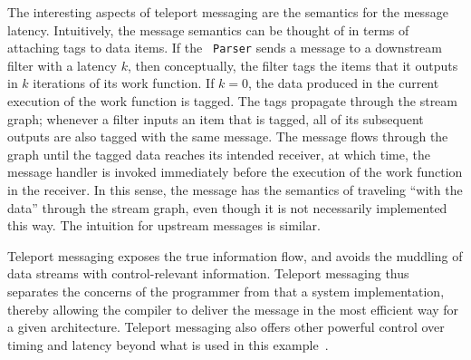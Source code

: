 The interesting aspects of teleport messaging are the semantics for
the message latency.  Intuitively, the message semantics can be
thought of in terms of attaching tags to data items.  If the {\tt
Parser} sends a message to a downstream filter with a latency $k$,
then conceptually, the filter tags the items that it outputs in $k$
iterations of its work function. If $k=0$, the data produced in the
current execution of the work function is tagged. The tags propagate
through the stream graph; whenever a filter inputs an item that is
tagged, all of its subsequent outputs are also tagged with the same
message. The message flows through the graph until the tagged data
reaches its intended receiver, at which time, the message handler is
invoked immediately before the execution of the work function in the
receiver.  In this sense, the message has the semantics of traveling
``with the data'' through the stream graph, even though it is not
necessarily implemented this way.  The intuition for upstream messages
is similar.

Teleport messaging exposes the true information flow, and avoids the
muddling of data streams with control-relevant information. Teleport
messaging thus separates the concerns of the programmer from that a
system implementation, thereby allowing the compiler to deliver the
message in the most efficient way for a given architecture. Teleport
messaging also offers other powerful control over timing and latency
beyond what is used in this example~\cite{thies05ppopp}.
